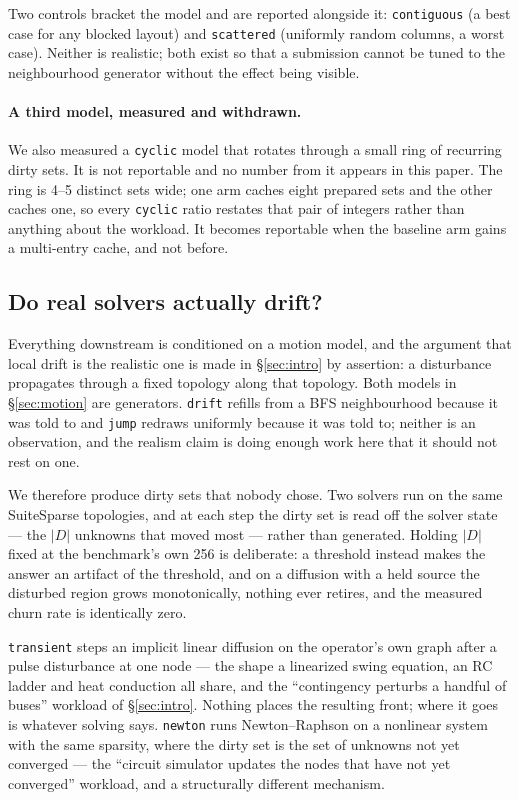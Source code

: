 \documentclass{article}
\begin{document}
Two controls bracket the model and are reported alongside it: \texttt{contiguous}
(a best case for any blocked layout) and \texttt{scattered} (uniformly random
columns, a worst case). Neither is realistic; both exist so that a submission
cannot be tuned to the neighbourhood generator without the effect being visible.

\paragraph{A third model, measured and withdrawn.}
We also measured a \texttt{cyclic} model that rotates through a small ring of
recurring dirty sets. It is not reportable and no number from it appears in this
paper. The ring is 4--5 distinct sets wide; one arm caches eight prepared sets
and the other caches one, so every \texttt{cyclic} ratio restates that pair of
integers rather than anything about the workload. It becomes reportable when the
baseline arm gains a multi-entry cache, and not before.

\subsection{Do real solvers actually drift?}
\label{sec:realmotion}

Everything downstream is conditioned on a motion model, and the argument that
local drift is the realistic one is made in \S\ref{sec:intro} by assertion: a
disturbance propagates through a fixed topology along that topology. Both models
in \S\ref{sec:motion} are generators. \texttt{drift} refills from a BFS
neighbourhood because it was told to and \texttt{jump} redraws uniformly because
it was told to; neither is an observation, and the realism claim is doing enough
work here that it should not rest on one.

We therefore produce dirty sets that nobody chose. Two solvers run on the same
SuiteSparse topologies, and at each step the dirty set is read off the solver
state --- the $|D|$ unknowns that moved most --- rather than generated. Holding
$|D|$ fixed at the benchmark's own 256 is deliberate: a threshold instead makes
the answer an artifact of the threshold, and on a diffusion with a held source
the disturbed region grows monotonically, nothing ever retires, and the measured
churn rate is identically zero.

\texttt{transient} steps an implicit linear diffusion on the operator's own
graph after a pulse disturbance at one node --- the shape a linearized swing
equation, an RC ladder and heat conduction all share, and the ``contingency
perturbs a handful of buses'' workload of \S\ref{sec:intro}. Nothing places the
resulting front; where it goes is whatever solving says. \texttt{newton} runs
Newton--Raphson on a nonlinear system with the same sparsity, where the dirty
set is the set of unknowns not yet converged --- the ``circuit simulator updates
the nodes that have not yet converged'' workload, and a structurally different
mechanism.
\end{document}
